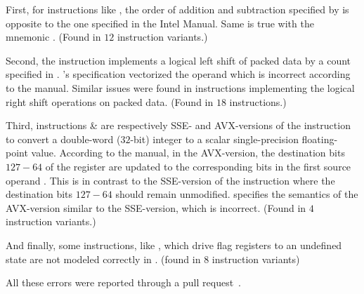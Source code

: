 \vspace{2pt}
\noindent First, for instructions like  , the order of addition and subtraction specified by \Stoke is opposite to the one specified in the Intel Manual. Same is true with the mnemonic . (Found in $12$ instruction variants.)

\vspace{2pt}
\noindent Second, the instruction  implements a logical left shift of packed data by a count specified in . \Stoke's specification vectorized the operand  which is incorrect according to the manual. Similar issues were found in instructions implementing the logical right shift operations on packed data. (Found in  $18$ instructions.)

\vspace{2pt}
\noindent Third, instructions  \&   are respectively SSE- and AVX-versions of the instruction to  convert a double-word ($32$-bit) integer to a scalar single-precision floating-point value. According to the manual, in the AVX-version,  the  destination bits $127-64$ of the  register  are updated to the corresponding bits in the first source operand . This  is in contrast to the SSE-version of the instruction where the destination bits $127-64$ should remain unmodified. \Stoke specifies the semantics of the AVX-version similar to the SSE-version, which is incorrect.  (Found in $4$ instruction variants.)

\vspace{2pt}
\noindent And finally, some instructions, like , which drive flag registers to an undefined state are not modeled correctly in \Stoke.    (found in $8$ instruction variants)

\vspace{2pt}
\noindent All these errors were reported through a pull request~\cite{BugStoke983,BugStoke986}.

